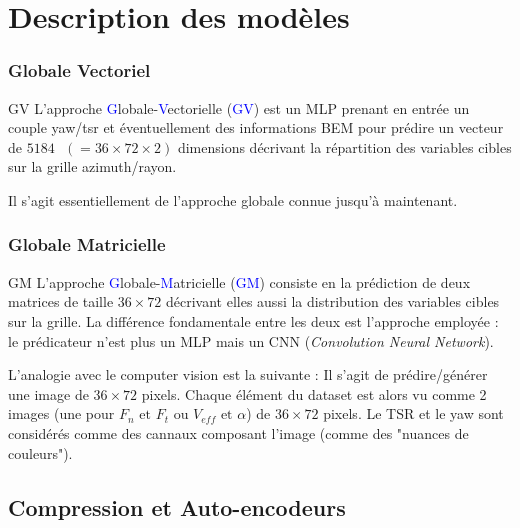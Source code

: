 \documentclass[
11pt,notheorems,hyperref={pdfauthor=whatever}
]{beamer}
\begin{document}
\section{Description des modèles}

\subsubsection{Globale Vectoriel}

\begin{frame}{GV}
    L'approche \textcolor{blue}{G}lobale-\textcolor{blue}{V}ectorielle (\textcolor{blue}{GV}) est un MLP prenant en 
    entrée un couple yaw/tsr et éventuellement des informations BEM pour prédire un  vecteur de $5184 \text{ }(= 36 \times 72 \times 2)$ dimensions
    décrivant la répartition des variables cibles sur la grille azimuth/rayon. 

    \vspace{0.3cm}

    Il s'agit essentiellement de l'approche globale connue jusqu'à maintenant.
\end{frame}

\subsubsection{Globale Matricielle}

\begin{frame}{GM}
    L'approche \textcolor{blue}{G}lobale-\textcolor{blue}{M}atricielle (\textcolor{blue}{GM}) consiste en la prédiction de deux matrices de taille
    $36 \times 72$ décrivant elles aussi la distribution des variables cibles sur la grille. La différence fondamentale entre les
    deux est l'approche employée : le prédicateur n'est plus un MLP mais un CNN (\textit{Convolution Neural Network}).

    \vspace{0.3cm}

    L'analogie avec le computer vision est la suivante : Il s'agit de prédire/générer une image de $36 \times 72$ pixels. 
    Chaque élément du dataset est alors vu comme 2 images (une pour $F_n \text{ et } F_t$ ou $V_{eff} \text{ et } \alpha$) de $36 \times 72$ pixels.
    Le TSR et le yaw sont considérés comme des cannaux composant l'image (comme des "nuances de couleurs").  
\end{frame}


\subsection{Compression et Auto-encodeurs}
\end{document}
